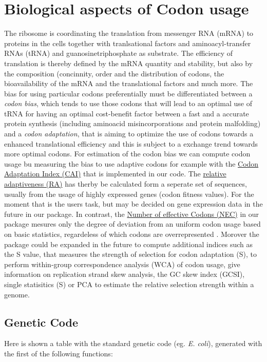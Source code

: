 \section{Biological aspects of Codon usage}
The ribosome is coordinating the translation from messenger RNA (mRNA) to proteins in the cells together with tranlsational factors and aminoacyl-transfer RNAs (tRNA) and guanosinetriphosphate as substrate. The efficiency of translation is thereby defined by the mRNA quantity and stability, but also by the composition (concinnity, order and the distribution of codons, the bioavailability of the mRNA and the translational factors and much more. The bias for using particular codons preferentially must be differentiated between a \textit{codon bias}, which tends to use those codons that will lead to an optimal use of tRNA for having an optimal cost-benefit factor between a fast and a accurate protein synthesis (including aminoacid misincorporations and protein malfolding) and a \textit{codon adaptation}, that is aiming to optimize the use of codons towards a enhanced translational efficiency and this is subject to a exchange trend towards more optimal codons.
For estimation of the codon bias we can compute codon usage bu measuring the bias to use adaptive codons for example with the \hyperlink{function:CAI}{Codon Adaptation Index (CAI)} that is implemented in our code. The \hyperlink{function:RA}{relative adaptiveness (RA)} has therby be calculated form a seperate set of sequences, usually from the usage of highly expressed genes (codon fitness values). For the moment that is the users task, but may be decided on gene expression data in the future in our package. In contrast, the 
\hyperlink{function:NEC}{Number of effective Codons (NEC)} in our package mesures only the degree of deviation from an uniform codon usage based on basic statistics, regardeless of which codons are overrepresented \cite{Suzuki2016}.
Morover the package could be expanded in the future to compute additional indices such as the S value, that measures the strength of selection for codon adaptation (S), to perform within-group correspondence analysis (WCA) of codon usage, give information on replication strand skew analysis, the GC skew index (GCSI), single statisitics (S) or PCA to estimate the relative selection strength within a genome.

\subsection{Genetic Code}
Here is shown a table with the standard genetic code (eg. \textit{E. coli}), generated with the first of the following functions:  
  


